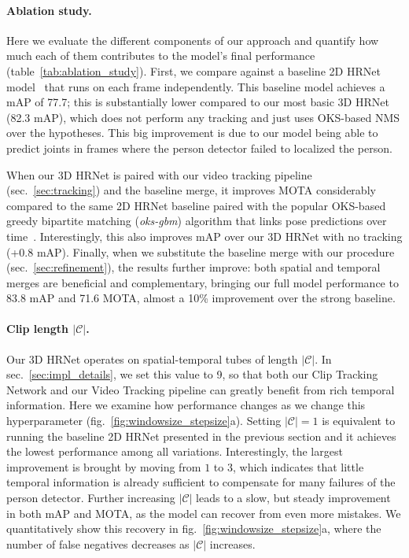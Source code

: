 \documentclass[10pt,twocolumn,letterpaper]{article}
\begin{document}
\paragraph{Ablation study.} Here we evaluate the different components of our approach and quantify how much each of them contributes to the model's final performance (table~\ref{tab:ablation_study}). First, we compare against a baseline 2D HRNet model~\cite{sun2019deep} that runs on each frame independently. This baseline model achieves a mAP of 77.7; this is substantially lower compared to our most basic 3D HRNet (82.3 mAP), which does not perform any tracking and just uses OKS-based NMS over the hypotheses. This big improvement is due to our model being able to predict joints in frames where the person detector failed to localized the person. 

When our 3D HRNet is paired with our video tracking pipeline (sec.~\ref{sec:tracking}) and the baseline merge, it improves MOTA considerably compared to the same 2D HRNet baseline paired with the popular OKS-based greedy bipartite matching ({\it oks-gbm}) algorithm that links pose predictions over time~\cite{girdhar2018detecttrack,xiao2018simple}. Interestingly, this also improves mAP over our 3D HRNet with no tracking (+0.8 mAP).
Finally, when we substitute the baseline merge with our procedure (sec.~\ref{sec:refinement}), the results further improve: both spatial and temporal merges are beneficial and complementary, bringing our full model performance to 83.8 mAP and 71.6 MOTA, almost a 10\% improvement over the strong baseline.

 \vspace{-3mm}
\paragraph{Clip length $|\mathcal{C}|$.}
Our 3D HRNet operates on spatial-temporal tubes of length $|\mathcal{C}|$. In sec.~\ref{sec:impl_details}, we set this value to 9, so that both our Clip Tracking Network and our Video Tracking pipeline can greatly benefit from rich temporal information. Here we examine how performance changes as we change this hyperparameter (fig.~\ref{fig:windowsize_stepsize}{\color{red}a}). Setting $|\mathcal{C}|=1$ is equivalent to running the baseline 2D HRNet presented in the previous section and it achieves the lowest performance among all variations.
Interestingly, the largest improvement is brought by moving from $1$ to $3$, which indicates that little temporal information is already sufficient to compensate for many failures of the person detector. 
Further increasing $|\mathcal{C}|$ leads to a slow, but steady improvement in both mAP and MOTA, as the model can recover from even more mistakes. We quantitatively show this recovery in fig.~\ref{fig:windowsize_stepsize}{\color{red}a}, where the number of false negatives decreases as $|\mathcal{C}|$ increases. 
\end{document}
